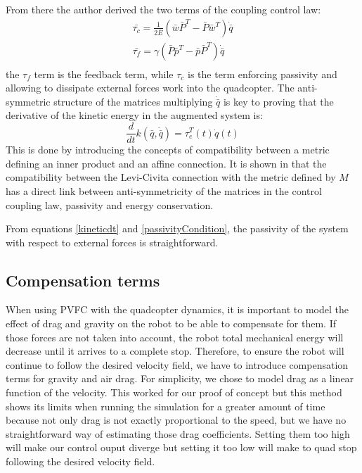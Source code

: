 From there the author derived the two terms of the coupling control law: 
\begin{align}
    \bar{\tau_c} = \frac{1}{2\bar{E}}(\bar{w}\bar{P}^T - \bar{P}\bar{w}^T ) \dot{\bar{q}} \label{tauc}\\
    \bar{\tau_f} = \gamma(\bar{P}\bar{p}^T - \bar{p}\bar{P}^T ) \dot{\bar{q}} \label{tauf}\\
\end{align}
the $\tau_f$ term is the feedback term, while $\tau_c$ is the term enforcing passivity and allowing to dissipate external forces work into the quadcopter.
The anti-symmetric structure of the matrices multiplying $\dot{\bar{q}}$ is key to proving that the derivative of the kinetic energy in the augmented system is: 
\begin{equation}
    \frac{d}{dt}k(\bar{q}, \dot{\bar{q}}) = \tau_e^T(t)\dot{q}(t) \label{kineticdt}
\end{equation}
This is done by introducing the concepts of compatibility between a metric defining an inner product and an affine connection. It is shown in \cite{li2001passive} that the compatibility between the Levi-Civita connection with the metric defined by $M$ has a direct link between anti-symmetricity of the matrices in the control coupling law, passivity and energy conservation.

From equations \ref{kineticdt} and \ref{passivityCondition}, the passivity of the system with respect to external forces is straightforward.

\subsection{Compensation terms}
When using PVFC with the quadcopter dynamics, it is important to model the effect of drag and gravity on the robot to be able to compensate for them. If those forces are not taken into account, the robot total mechanical energy will decrease until it arrives to a complete stop. 
Therefore, to ensure the robot will continue to follow the desired velocity field, we have to introduce compensation terms for gravity and air drag. 
For simplicity, we chose to model drag as a linear function of the velocity. This worked for our proof of concept but this method 
shows its limits when running the simulation for a greater amount of time because not only drag is not exactly proportional to the speed, but we have no straightforward way of estimating those drag coefficients.
Setting them too high will make our control ouput diverge but setting it too low will make to quad stop following the desired velocity field.  
